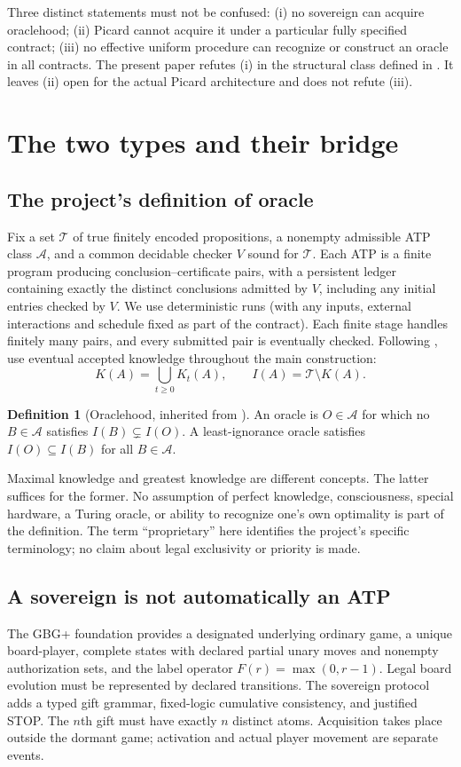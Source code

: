 \documentclass[11pt]{article}
\theoremstyle{definition}\newtheorem{definition}[theorem]{Definition}
\newcommand{\T}{\mathcal T}\newcommand{\A}{\mathcal A}\newcommand{\id}{\operatorname{ID}}\newcommand{\Con}{\operatorname{Con}}\newcommand{\Oracle}{\operatorname{Oracle}}\newcommand{\Btrade}{\mathrm{B11}}
\begin{document}
Three distinct statements must not be confused: (i) no sovereign can acquire oraclehood; (ii) Picard cannot acquire it under a particular fully specified contract; (iii) no effective uniform procedure can recognize or construct an oracle in all contracts. The present paper refutes (i) in the structural class defined in \cite[Def.~13.1]{gift}. It leaves (ii) open for the actual Picard architecture and does not refute (iii).
\section{The two types and their bridge}
\subsection{The project's definition of oracle}
Fix a set $\T$ of true finitely encoded propositions, a nonempty admissible ATP class $\A$, and a common decidable checker $V$ sound for $\T$. Each ATP is a finite program producing conclusion--certificate pairs, with a persistent ledger containing exactly the distinct conclusions admitted by $V$, including any initial entries checked by $V$. We use deterministic runs (with any inputs, external interactions and schedule fixed as part of the contract). Each finite stage handles finitely many pairs, and every submitted pair is eventually checked. Following \cite[Def.~2.1]{oracle}, use eventual accepted knowledge throughout the main construction:
\[
 K(A)=\bigcup_{t\geq 0}K_t(A),\qquad I(A)=\T\setminus K(A).
\]
\begin{definition}[Oraclehood, inherited from \cite{oracle}]
An oracle is $O\in\A$ for which no $B\in\A$ satisfies $I(B)\subsetneq I(O)$. A least-ignorance oracle satisfies $I(O)\subseteq I(B)$ for all $B\in\A$.
\end{definition}
Maximal knowledge and greatest knowledge are different concepts. The latter suffices for the former. No assumption of perfect knowledge, consciousness, special hardware, a Turing oracle, or ability to recognize one's own optimality is part of the definition. The term ``proprietary'' here identifies the project's specific terminology; no claim about legal exclusivity or priority is made.
\subsection{A sovereign is not automatically an ATP}
The GBG+ foundation \cite[Defs.~12.1, 13.1; Axioms 13.2--13.6]{gbg} provides a designated underlying ordinary game, a unique board-player, complete states with declared partial unary moves and nonempty authorization sets, and the label operator $F(r)=\max(0,r-1)$. Legal board evolution must be represented by declared transitions. The sovereign protocol \cite[Defs.~3.1, 6.1, 7.1, 13.1]{gift} adds a typed gift grammar, fixed-logic cumulative consistency, and justified STOP. The $n$th gift must have exactly $n$ distinct atoms. Acquisition takes place outside the dormant game; activation and actual player movement are separate events.
\end{document}
